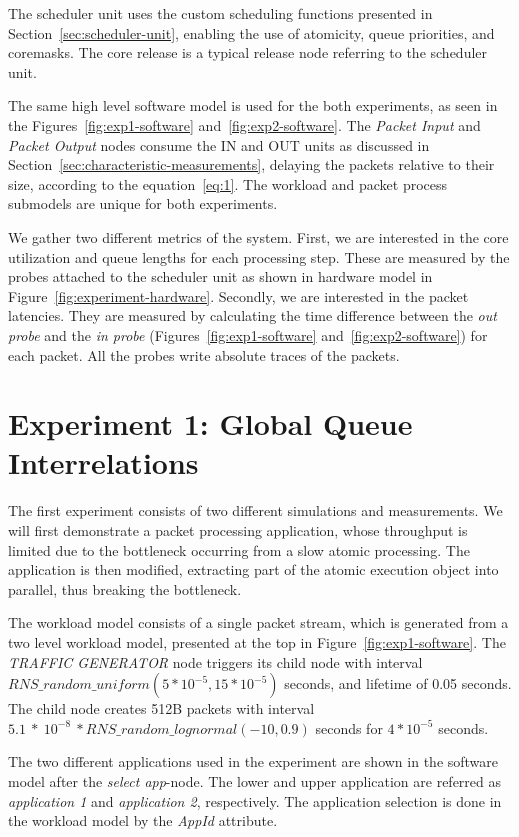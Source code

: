 The scheduler unit uses the custom scheduling functions presented in Section~\ref{sec:scheduler-unit}, enabling the use of atomicity, queue priorities, and coremasks. The core release is a typical release node referring to the scheduler unit.

The same high level software model is used for the both experiments, as seen in the Figures~\ref{fig:exp1-software} and~\ref{fig:exp2-software}. The \emph{Packet Input} and \emph{Packet Output} nodes consume the IN and OUT units as discussed in Section~\ref{sec:characteristic-measurements}, delaying the packets relative to their size, according to the equation~\ref{eq:1}. The workload and packet process submodels are unique for both experiments.

We gather two different metrics of the system. First, we are interested in the core utilization and queue lengths for each processing step. These are measured by the probes attached to the scheduler unit as shown in hardware model in Figure~\ref{fig:experiment-hardware}. Secondly, we are interested in the packet latencies. They are measured by calculating the time difference between the \emph{out probe} and the \emph{in probe} (Figures~\ref{fig:exp1-software} and~\ref{fig:exp2-software}) for each packet. All the probes write absolute traces of the packets.

\section{Experiment 1: Global Queue Interrelations}
The first experiment consists of two different simulations and measurements. We will first demonstrate a packet processing application, whose throughput is limited due to the bottleneck occurring from a slow atomic processing. The application is then modified, extracting part of the atomic execution object into parallel, thus breaking the bottleneck.

The workload model consists of a single packet stream, which is generated from a two level workload model, presented at the top in Figure~\ref{fig:exp1-software}. The \emph{TRAFFIC GENERATOR} node triggers its child node with interval $RNS\_random\_uniform(5*10^{-5}, 15*10^{-5})$ seconds, and lifetime of 0.05 seconds. The child node creates 512B packets with interval $5.1~*~10^{-8}~* RNS\_random\_lognormal(-10, 0.9)$ seconds for $4*10^{-5}$ seconds.

The two different applications used in the experiment are shown in the software model after the \emph{select app}-node. The lower and upper application are referred as \emph{application 1} and \emph{application 2}, respectively. The application selection is done in the workload model by the \emph{AppId} attribute.

